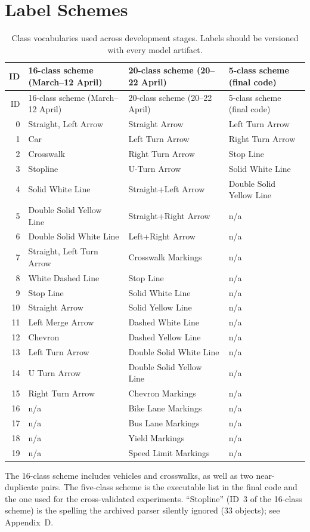 \documentclass[11pt]{article}
\begin{document}
\section{Label Schemes}
\begin{longtable}{r P{0.30\textwidth} P{0.32\textwidth} P{0.22\textwidth}}
\caption{Class vocabularies used across development stages. Labels should be versioned with every model artifact.}\label{tab:labels}\\
\toprule ID & 16-class scheme (March--12 April) & 20-class scheme (20--22 April) & 5-class scheme (final code) \\
\midrule
\endfirsthead
\toprule ID & 16-class scheme (March--12 April) & 20-class scheme (20--22 April) & 5-class scheme (final code) \\
\midrule
{} & Straight, Left Arrow & Straight Arrow & Left Turn Arrow \\
1 & Car & Left Turn Arrow & Right Turn Arrow \\
2 & Crosswalk & Right Turn Arrow & Stop Line \\
3 & Stopline & U-Turn Arrow & Solid White Line \\
4 & Solid White Line & Straight+Left Arrow & Double Solid Yellow Line \\
5 & Double Solid Yellow Line & Straight+Right Arrow & n/a \\
6 & Double Solid White Line & Left+Right Arrow & n/a \\
7 & Straight, Left Turn Arrow & Crosswalk Markings & n/a \\
8 & White Dashed Line & Stop Line & n/a \\
9 & Stop Line & Solid White Line & n/a \\
10 & Straight Arrow & Solid Yellow Line & n/a \\
11 & Left Merge Arrow & Dashed White Line & n/a \\
12 & Chevron & Dashed Yellow Line & n/a \\
13 & Left Turn Arrow & Double Solid White Line & n/a \\
14 & U Turn Arrow & Double Solid Yellow Line & n/a \\
15 & Right Turn Arrow & Chevron Markings & n/a \\
16 & n/a & Bike Lane Markings & n/a \\
17 & n/a & Bus Lane Markings & n/a \\
18 & n/a & Yield Markings & n/a \\
19 & n/a & Speed Limit Markings & n/a \\
\bottomrule
\end{longtable}
\noindent\footnotesize The 16-class scheme includes vehicles and crosswalks, as well as two near-duplicate pairs. The five-class scheme is the executable list in the final code and the one used for the cross-validated experiments. ``Stopline'' (ID~3 of the 16-class scheme) is the spelling the archived parser silently ignored (33 objects); see Appendix~D.
\end{document}

